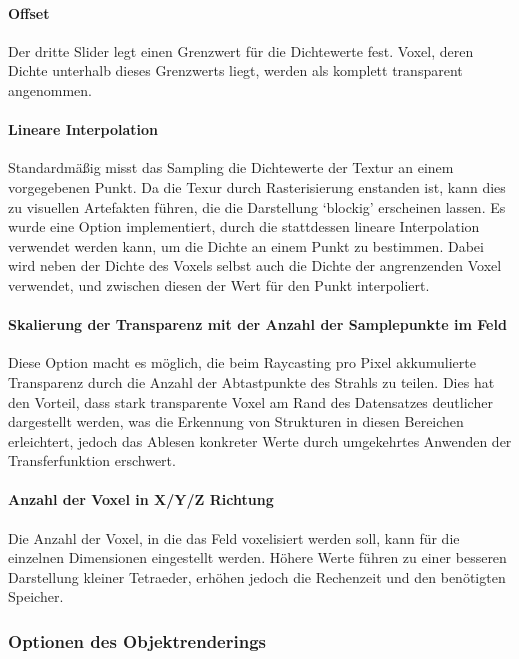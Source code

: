 \documentclass[a4paper,fontsize=12pt,toc=bib,halfparskip,ngerman]{scrartcl}
\begin{document}
\paragraph{Offset}
Der dritte Slider legt einen Grenzwert f\"ur die Dichtewerte fest. Voxel, deren Dichte unterhalb dieses Grenzwerts liegt, werden als komplett transparent angenommen.

\paragraph{Lineare Interpolation}
Standardm\"a{\ss}ig misst das Sampling die Dichtewerte der Textur an einem vorgegebenen Punkt. Da die Texur durch Rasterisierung enstanden ist, kann dies zu visuellen Artefakten f\"uhren, die die Darstellung `blockig' erscheinen lassen. Es wurde eine Option implementiert, durch die stattdessen lineare Interpolation verwendet werden kann, um die Dichte an einem Punkt zu bestimmen. Dabei wird neben der Dichte des Voxels selbst auch die Dichte der angrenzenden Voxel verwendet, und zwischen diesen der Wert f\"ur den Punkt interpoliert.

\paragraph{Skalierung der Transparenz mit der Anzahl der Samplepunkte im Feld}
Diese Option macht es m\"oglich, die beim Raycasting pro Pixel akkumulierte Transparenz durch die Anzahl der Abtastpunkte des Strahls zu teilen. Dies hat den Vorteil, dass stark transparente Voxel am Rand des Datensatzes deutlicher dargestellt werden, was die Erkennung von Strukturen in diesen Bereichen erleichtert, jedoch das Ablesen konkreter Werte durch umgekehrtes Anwenden der Transferfunktion erschwert.

\paragraph{Anzahl der Voxel in X/Y/Z Richtung}
Die Anzahl der Voxel, in die das Feld voxelisiert werden soll, kann f\"ur die einzelnen Dimensionen eingestellt werden. H\"ohere Werte f\"uhren zu einer besseren Darstellung kleiner Tetraeder, erh\"ohen jedoch die Rechenzeit und den ben\"otigten Speicher.

\subsubsection{Optionen des Objektrenderings}
\end{document}

